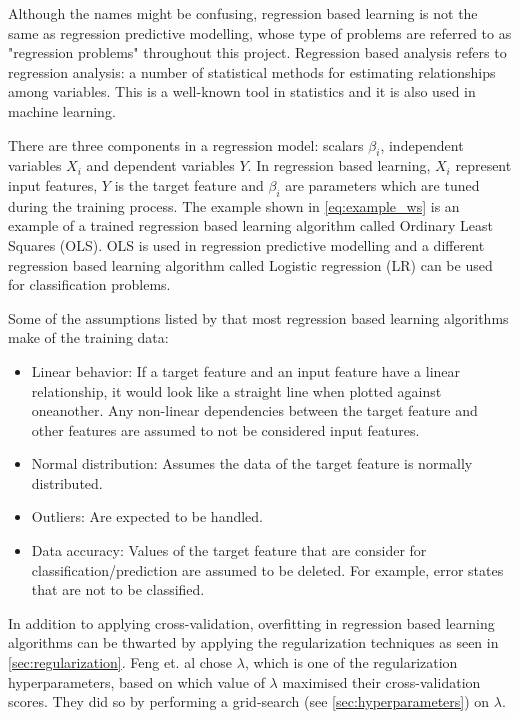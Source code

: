 		Although the names might be confusing, regression based learning is not the same as regression predictive modelling, whose type of problems are referred to as "regression problems" throughout this project. Regression based analysis refers to regression analysis: a number of statistical methods for estimating relationships among variables. This is a well-known tool in statistics and it is also used in machine learning. 

		There are three components in a regression model: scalars $\beta_i$, independent variables $X_i$ and dependent variables $Y$. In regression based learning, $X_i$ represent input features, $Y$ is the target feature and $\beta_i$ are parameters which are tuned during the training process. The example shown in \ref{eq:example_ws} is an example of a trained regression based learning algorithm called Ordinary Least Squares (OLS). OLS is used in regression predictive modelling and a different regression based learning algorithm called Logistic regression (LR) can be used for classification problems. 

		Some of the assumptions listed by \cite{BOOK:6} that most regression based learning algorithms make of the training data:
	\begin{itemize}
		\item{Linear behavior:} If a target feature and an input feature have a linear relationship, it would look like a straight line when plotted against oneanother. Any non-linear dependencies between the target feature and other features are assumed to not be considered input features.
		\item{Normal distribution:} Assumes the data of the target feature is normally distributed.
		\item{Outliers:} Are expected to be handled.
		\item{Data accuracy:} Values of the target feature that are consider for classification/prediction are assumed to be deleted. For example, error states that are not to be classified.
	\end{itemize} %

		In addition to applying cross-validation, overfitting in regression based learning algorithms can be thwarted by applying the regularization techniques as seen in \ref{sec:regularization}. Feng et. al \cite{ARTICLE:15} chose $\lambda$, which is one of the regularization hyperparameters,  based on which value of $\lambda$ maximised their cross-validation scores. They did so by performing a grid-search (see \ref{sec:hyperparameters}) on $\lambda$. %

